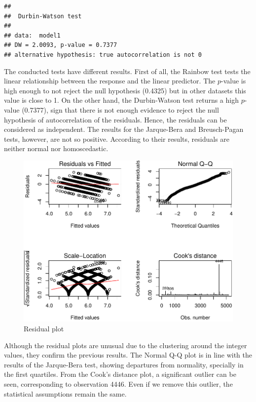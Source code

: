 \documentclass[12pt,]{article}
\begin{document}
\begin{verbatim}
## 
##  Durbin-Watson test
## 
## data:  model1
## DW = 2.0093, p-value = 0.7377
## alternative hypothesis: true autocorrelation is not 0
\end{verbatim}

The conducted tests have different results. First of all, the Rainbow
test tests the linear relationship between the response and the linear
predictor. The \(p\)-value is high enough to not reject the null
hypothesis (0.4325) but in other datasets this value is close to 1. On
the other hand, the Durbin-Watson test returns a high \(p\)-value
(0.7377), sign that there is not enough evidence to reject the null
hypothesis of autocorrelation of the residuals. Hence, the residuals can
be considered as independent. The results for the Jarque-Bera and
Breusch-Pagan tests, however, are not so positive. According to their
results, residuals are neither normal nor homoscedastic.

\begin{figure}

{\centering \includegraphics{quality-regression_files/figure-latex/residualplot-1} 

}

\caption{Residual plot}\label{fig:residualplot}
\end{figure}

Although the residual plots are unusual due to the clustering around the
integer values, they confirm the previous results. The Normal Q-Q plot
is in line with the results of the Jarque-Bera test, showing departures
from normality, specially in the first quartiles. From the Cook's
distance plot, a significant outlier can be seen, corresponding to
observation 4446. Even if we remove this outlier, the statistical
assumptions remain the same.
\end{document}
